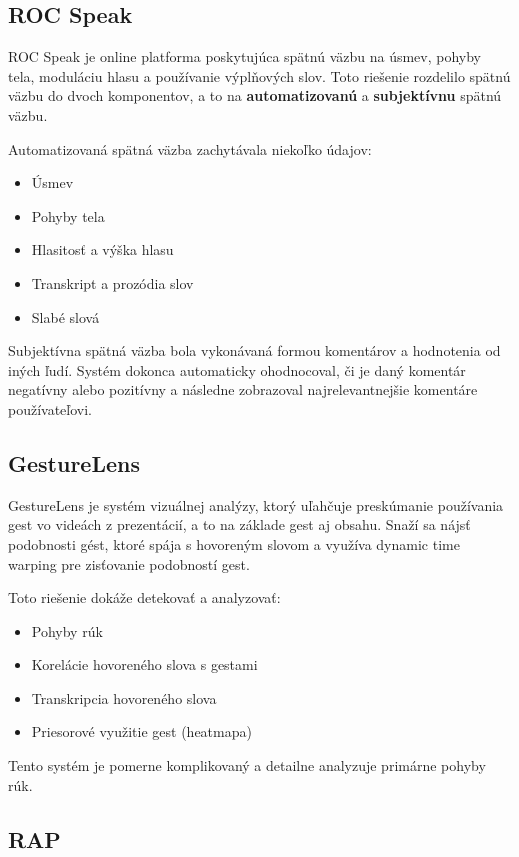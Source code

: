 \subsection{ROC Speak}

ROC Speak je online platforma poskytujúca spätnú väzbu na úsmev, pohyby tela, moduláciu hlasu a používanie výplňových slov\cite{rocSpeak}. Toto riešenie rozdelilo spätnú väzbu do dvoch komponentov, a to na \textbf{automatizovanú} a \textbf{subjektívnu} spätnú väzbu.

Automatizovaná spätná väzba zachytávala niekoľko údajov:
\begin{itemize}
    \item Úsmev
    \item Pohyby tela
    \item Hlasitosť a výška hlasu
    \item Transkript a prozódia slov
    \item Slabé slová
\end{itemize}

Subjektívna spätná väzba bola vykonávaná formou komentárov a hodnotenia od iných ľudí. Systém dokonca automaticky ohodnocoval, či je daný komentár negatívny alebo pozitívny a následne zobrazoval najrelevantnejšie komentáre používateľovi.

\subsection{GestureLens}

GestureLens je systém vizuálnej analýzy, ktorý uľahčuje preskúmanie používania gest vo videách z prezentácií, a to na základe gest aj obsahu\cite{gestureLens}. Snaží sa nájsť podobnosti gést, ktoré spája s hovoreným slovom a využíva dynamic time warping pre zisťovanie podobností gest.

Toto riešenie dokáže detekovať a analyzovať:
\begin{itemize}
    \item Pohyby rúk
    \item Korelácie hovoreného slova s gestami
    \item Transkripcia hovoreného slova
    \item Priesorové využitie gest (heatmapa)
\end{itemize}

Tento systém je pomerne komplikovaný a detailne analyzuje primárne pohyby rúk.

\subsection{RAP}

